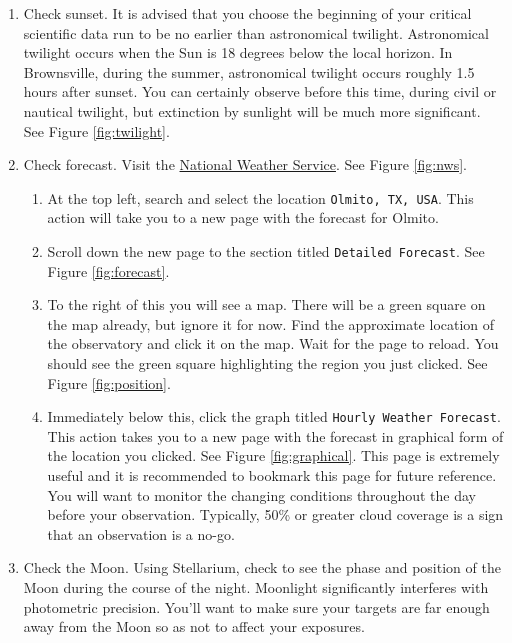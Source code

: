 \documentclass{article}
\begin{document}
	\begin{enumerate}
		
		\item Check sunset. It is advised that you choose the beginning of your critical scientific data run to be no earlier than astronomical twilight. Astronomical twilight occurs when the Sun is 18 degrees below the local horizon. In Brownsville, during the summer, astronomical twilight occurs roughly 1.5 hours after sunset. You can certainly observe before this time, during civil or nautical twilight, but extinction by sunlight will be much more significant. See Figure \ref{fig:twilight}.
		
		\item Check forecast. Visit the \href{https://www.weather.gov}{National Weather Service}. See Figure \ref{fig:nws}.
		
		\begin{enumerate}
			
			\item At the top left, search and select the location \texttt{Olmito, TX, USA}. This action will take you to a new page with the forecast for Olmito.		
			
			\item Scroll down the new page to the section titled \texttt{Detailed Forecast}. See Figure \ref{fig:forecast}.
			
			\item To the right of this you will see a map. There will be a green square on the map already, but ignore it for now. Find the approximate location of the observatory and click it on the map. Wait for the page to reload. You should see the green square highlighting the region you just clicked. See Figure \ref{fig:position}.
			
			\item Immediately below this, click the graph titled \texttt{Hourly Weather Forecast}. This action takes you to a new page with the forecast in graphical form of the location you clicked. See Figure \ref{fig:graphical}. This page is extremely useful and it is recommended to bookmark this page for future reference. You will want to monitor the changing conditions throughout the day before your observation. Typically, 50\% or greater cloud coverage is a sign that an observation is a no-go.
			
		\end{enumerate}
		
		\item Check the Moon. Using Stellarium, check to see the phase and position of the Moon during the course of the night. Moonlight significantly interferes with photometric precision. You'll want to make sure your targets are far enough away from the Moon so as not to affect your exposures.
		
	\end{enumerate}
	
\end{document}
